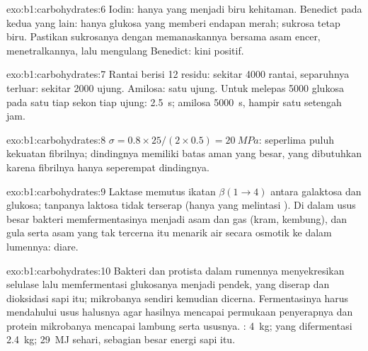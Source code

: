 \begin{solution}{exo:b1:carbohydrates:6}
Iodin: hanya  yang menjadi biru kehitaman. Benedict pada kedua yang
lain: hanya glukosa yang memberi endapan merah; sukrosa tetap biru.
Pastikan sukrosanya dengan memanaskannya bersama asam encer,
menetralkannya, lalu mengulang Benedict: kini positif.
\end{solution}

\begin{solution}{exo:b1:carbohydrates:7}
Rantai berisi 12 residu: sekitar \num{4000} rantai, separuhnya
terluar: sekitar \num{2000} ujung. Amilosa: satu ujung. Untuk melepas
\num{5000} glukosa pada satu tiap sekon tiap ujung: 
\qty{2.5}{s}; amilosa \qty{5000}{s}, hampir satu setengah jam.
\end{solution}

\begin{solution}{exo:b1:carbohydrates:8}
$\sigma = 0.8\times 25/(2\times 0.5) = \qty{20}{MPa}$: seperlima puluh
kekuatan fibrilnya; dindingnya memiliki batas aman yang besar, yang
dibutuhkan karena fibrilnya hanya seperempat dindingnya.
\end{solution}

\begin{solution}{exo:b1:carbohydrates:9}
Laktase memutus ikatan $\beta(1{\to}4)$ antara galaktosa dan glukosa;
tanpanya laktosa tidak terserap (hanya  yang melintasi
). Di dalam usus besar bakteri memfermentasinya menjadi asam
dan gas (kram, kembung), dan gula serta asam yang tak tercerna itu
menarik air secara osmotik ke dalam lumennya: diare.
\end{solution}

\begin{solution}{exo:b1:carbohydrates:10}
Bakteri dan protista dalam rumennya menyekresikan selulase lalu
memfermentasi glukosanya menjadi  pendek, yang diserap dan
dioksidasi sapi itu; mikrobanya sendiri kemudian dicerna.
Fermentasinya harus mendahului usus halusnya agar hasilnya mencapai
permukaan penyerapnya dan protein mikrobanya mencapai lambung serta
ususnya. : \qty{4}{kg}; yang difermentasi \qty{2.4}{kg};
\qty{29}{MJ} sehari, sebagian besar energi sapi itu.
\end{solution}

